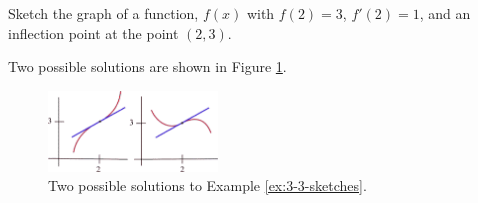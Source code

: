 \begin{example}
\label{ex:3-3-sketches}
Sketch the graph of a function, $f(x)$ with $f(2)=3$, $f'(2)=1$, and an inflection point at the point $(2,3)$.

\begin{solution} Two possible solutions are shown in Figure \ref{fig:3-3-sketches}.

\begin{figure}[!ht]
  \centering
    \includegraphics[width=0.4\textwidth]{img/chap3/image049.png}
    \caption{Two possible solutions to Example \ref{ex:3-3-sketches}.}
    \label{fig:3-3-sketches}
\end{figure}
\end{solution}\end{example}
